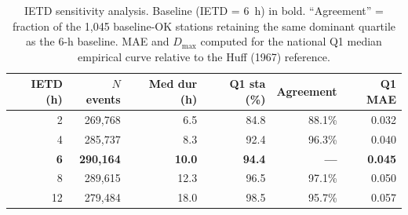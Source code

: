 \documentclass[a4paper,fleqn]{cas-sc}
\begin{document}
\begin{table}[!t]
  \centering
  \caption{IETD sensitivity analysis. Baseline (IETD = 6~h) in bold.
    ``Agreement'' = fraction of the 1{,}045 baseline-OK stations
    retaining the same dominant quartile as the 6-h baseline.
    MAE and $D_\mathrm{max}$ computed for the national Q1 median
    empirical curve relative to the Huff (1967) reference.}
  \label{tab:ietd}
  \begin{tabular}{rrrrrr}
    \toprule
    IETD (h) & $N$ events & Med dur (h) & Q1 sta (\%) &
      Agreement & Q1 MAE \\
    \midrule
    2  & 269{,}768 &  6.5 & 84.8 & 88.1\% & 0.032 \\
    4  & 285{,}737 &  8.3 & 92.4 & 96.3\% & 0.040 \\
    \textbf{6} & \textbf{290{,}164} & \textbf{10.0} & \textbf{94.4} &
      \textbf{—} & \textbf{0.045} \\
    8  & 289{,}615 & 12.3 & 96.5 & 97.1\% & 0.050 \\
    12 & 279{,}484 & 18.0 & 98.5 & 95.7\% & 0.057 \\
    \bottomrule
  \end{tabular}
\end{table}
\end{document}
